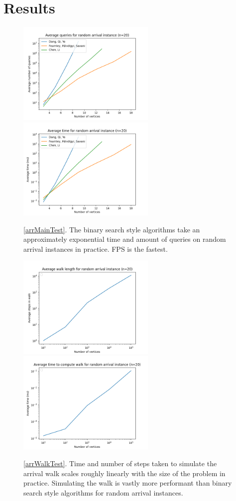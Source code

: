 \section{Results} \label{resultsSec}
  \vspace{-15pt}
  \begin{figure}[H]
      \centering
      \includegraphics[width=2.6in]{plots/arrival_queries.png}
      \centering
      \includegraphics[width=2.6in]{plots/arrival_time.png}
      \caption{\cref{arrMainTest}. The binary search style algorithms take an approximately
      exponential time and amount of queries on random arrival instances in practice. FPS is the fastest.} \label{arrivalMainPlot}
  \end{figure}
  \vspace{-22pt}
  \begin{figure}[H]
      \centering
      \includegraphics[width=2.6in]{plots/arrival_steps.png}
      \centering
      \includegraphics[width=2.6in]{plots/arrival_wtime.png}
      \caption{\cref{arrWalkTest}. Time and number of steps taken to simulate the arrival
      walk scales roughly linearly with the size of the problem in practice. Simulating
      the walk is vastly more performant than binary search style algorithms for random arrival instances.} \label{arrivalWalkPlot}
  \end{figure}
